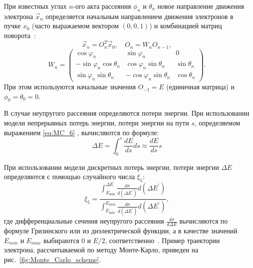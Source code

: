 При известных углах $n$-ого акта рассеяния $\phi_n$ и $\theta_n$ новое направление движения электрона $\vec{x}_n$ определяется начальным направлением движения электронов в пучке $x_0$ (часто выражаемом вектором $(0,0,1)$) и комбинацией матриц поворота~\cite{rotation_matrices}:
\begin{equation} \label{eq:MC_13}
	\vec{x}_n=O_n^T \vec{x}_0, \quad O_n=W_n O_{n-1},
\end{equation}
\begin{equation} \label{eq:MC_14}
	W_n=\left(\begin{array}{ccc}
		\cos \varphi_n & \sin \varphi_n & 0 \\
		-\sin \varphi_n \cos \theta_n & \cos \varphi_n \sin \theta_n & \sin \theta_n \\
		\sin \varphi_n \sin \theta_n & -\cos \varphi_n \sin \theta_n & \cos \theta_n
	\end{array}\right).
\end{equation}
При этом используются начальные значения $O_{-1} = E$ (единичная матрица) и $\phi_0 = \theta_0 = 0$.

В случае неупругого рассеяния определяются потери энергии. При использовании модели непрерывных потерь энергии, потери энергии на пути $s$, определяемом выражением \ref{eq:MC_6} , вычисляются по формуле:
\begin{equation} \label{eq:MC_15}
	\Delta E=\int_0^s \frac{d E}{d s} d s \approx \frac{d E}{d s} s
\end{equation}

При использовании модели дискретных потерь энергии, потери энергии $\Delta E$ определяются с помощью случайного числа $\xi_5$:
\begin{equation} \label{eq:MC_16}
	\xi_5 = \frac
	{\displaystyle \int_{E_{\min }}^{\Delta E} \frac{d \sigma}{d\left(\Delta E^{\prime}\right)} d\left(\Delta E^{\prime}\right)}
	{\displaystyle \int_{E_{\min }}^{E_{\max }} \frac{d \sigma}{d\left(\Delta E^{\prime}\right)} d\left(\Delta E^{\prime}\right)},
\end{equation}
где дифференциальные сечения неупругого рассеяния $\frac{d \sigma}{d \Delta E}$ вычисляются по формуле Гризинского или из диэлектрической функции, а в качестве значений $E_{min}$ и $E_{max}$ выбираются $0$ и $E/2$, соответственно~\cite{Dapor_large_book}. Пример траектории электрона, рассчитываемой по методу Монте-Карло, приведен на рис.~\ref{fig:Monte_Carlo_scheme}.


